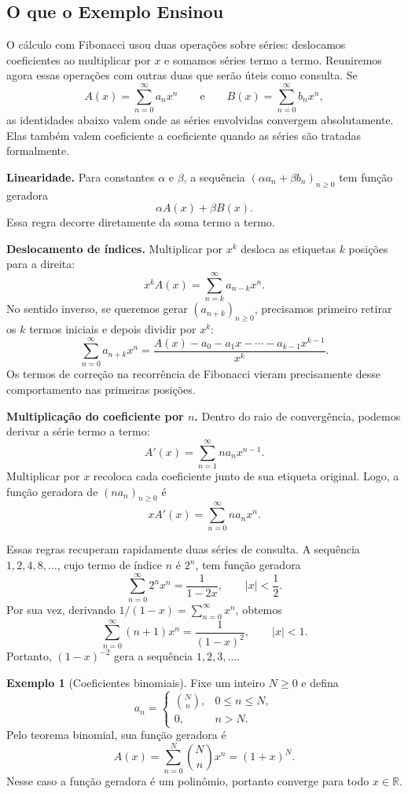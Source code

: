 \documentclass[12pt,portuguese]{article}
\theoremstyle{definition}
\newtheorem{example}[example]{Exemplo}
\theoremstyle{plainexercise}
\theoremstyle{starredexercise}
\theoremstyle{definition}
\begin{document}
\subsection{O que o Exemplo Ensinou}
\label{sec:calculo-funcoes-geradoras}

O cálculo com Fibonacci usou duas operações sobre séries: deslocamos
coeficientes ao multiplicar por $x$ e somamos séries termo a termo. Reuniremos
agora essas operações com outras duas que serão úteis como consulta. Se
\[
A(x)=\sum_{n=0}^{\infty}a_nx^n
\qquad\text{e}\qquad B(x)=\sum_{n=0}^{\infty}b_nx^n,
\]
as identidades abaixo valem onde as séries envolvidas convergem absolutamente.
Elas também valem coeficiente a coeficiente quando as séries são tratadas
formalmente.

\medskip
\noindent\textbf{Linearidade.}
Para constantes $\alpha$ e $\beta$, a sequência
$(\alpha a_n+\beta b_n)_{n\geqslant 0}$ tem função geradora
\[
\alpha A(x)+\beta B(x).
\]
Essa regra decorre diretamente da soma termo a termo.

\medskip
\noindent\textbf{Deslocamento de índices.}
Multiplicar por $x^k$ desloca as etiquetas $k$ posições para a direita:
\[
x^kA(x)=\sum_{n=k}^{\infty}a_{n-k}x^n.
\]
No sentido inverso, se queremos gerar $(a_{n+k})_{n\geqslant 0}$, precisamos
primeiro retirar os $k$ termos iniciais e depois dividir por $x^k$:
\[
\sum_{n=0}^{\infty}a_{n+k}x^n
=\frac{A(x)-a_0-a_1x-\cdots-a_{k-1}x^{k-1}}{x^k}.
\]
Os termos de correção na recorrência de Fibonacci vieram precisamente desse
comportamento nas primeiras posições.

\medskip
\noindent\textbf{Multiplicação do coeficiente por $n$.}
Dentro do raio de convergência, podemos derivar a série termo a termo:
\[
A'(x)=\sum_{n=1}^{\infty}na_nx^{n-1}.
\]
Multiplicar por $x$ recoloca cada coeficiente junto de sua etiqueta original.
Logo, a função geradora de $(na_n)_{n\geqslant 0}$ é
\[
xA'(x)=\sum_{n=0}^{\infty}na_nx^n.
\]

Essas regras recuperam rapidamente duas séries de consulta. A sequência
$1,2,4,8,\ldots$, cujo termo de índice $n$ é $2^n$, tem função geradora
\[
\sum_{n=0}^{\infty}2^nx^n=\frac{1}{1-2x},
\qquad |x|<\frac12.
\]
Por sua vez, derivando $1/(1-x)=\sum_{n=0}^{\infty}x^n$, obtemos
\[
\sum_{n=0}^{\infty}(n+1)x^n=\frac{1}{(1-x)^2},
\qquad |x|<1.
\]
Portanto, $(1-x)^{-2}$ gera a sequência $1,2,3,\ldots$.

\begin{example}[Coeficientes binomiais]\label{ex:gw-4-3}
Fixe um inteiro $N\geqslant 0$ e defina
\[
a_n=
\begin{cases}
\binom{N}{n},&0\leqslant n\leqslant N,\\
0,&n>N.
\end{cases}
\]
Pelo teorema binomial, sua função geradora é
\[
A(x)=\sum_{n=0}^{N}\binom{N}{n}x^n=(1+x)^N.
\]
Nesse caso a função geradora é um polinômio, portanto converge para todo
$x\in\mathbb{R}$.
\end{example}
\end{document}
